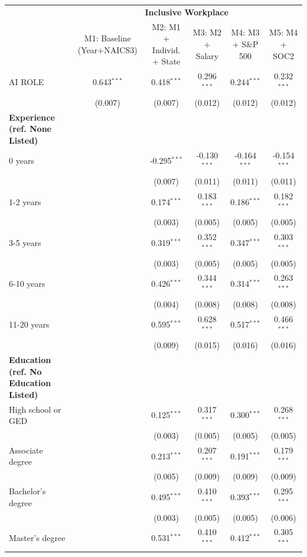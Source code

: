 \begin{table}[!htbp]
\centering
\tiny
\begin{tabular}{lccccc}
\toprule
 & \multicolumn{5}{c}{\textbf{Inclusive Workplace}} \\
 & M1: Baseline (Year+NAICS3) & M2: M1 + Individ. + State & M3: M2 + Salary & M4: M3 + S\&P 500 & M5: M4 + SOC2 \\
\midrule
AI ROLE & 0.643$^{***}$ & 0.418$^{***}$ & 0.296$^{***}$ & 0.244$^{***}$ & 0.232$^{***}$ \\
 & (0.007) & (0.007) & (0.012) & (0.012) & (0.012) \\
\midrule
\textbf{Experience (ref. None Listed)} &  &  &  &  &  \\
0 years &  & -0.295$^{***}$ & -0.130$^{***}$ & -0.164$^{***}$ & -0.154$^{***}$ \\
 &  & (0.007) & (0.011) & (0.011) & (0.011) \\
1-2 years &  & 0.174$^{***}$ & 0.183$^{***}$ & 0.186$^{***}$ & 0.182$^{***}$ \\
 &  & (0.003) & (0.005) & (0.005) & (0.005) \\
3-5 years &  & 0.319$^{***}$ & 0.352$^{***}$ & 0.347$^{***}$ & 0.303$^{***}$ \\
 &  & (0.003) & (0.005) & (0.005) & (0.005) \\
6-10 years &  & 0.426$^{***}$ & 0.344$^{***}$ & 0.314$^{***}$ & 0.263$^{***}$ \\
 &  & (0.004) & (0.008) & (0.008) & (0.008) \\
11-20 years &  & 0.595$^{***}$ & 0.628$^{***}$ & 0.517$^{***}$ & 0.466$^{***}$ \\
 &  & (0.009) & (0.015) & (0.016) & (0.016) \\
\midrule
\textbf{Education (ref. No Education Listed)} &  &  &  &  &  \\
High school or GED &  & 0.125$^{***}$ & 0.317$^{***}$ & 0.300$^{***}$ & 0.268$^{***}$ \\
 &  & (0.003) & (0.005) & (0.005) & (0.005) \\
Associate degree &  & 0.213$^{***}$ & 0.207$^{***}$ & 0.191$^{***}$ & 0.179$^{***}$ \\
 &  & (0.005) & (0.009) & (0.009) & (0.009) \\
Bachelor's degree &  & 0.495$^{***}$ & 0.410$^{***}$ & 0.393$^{***}$ & 0.295$^{***}$ \\
 &  & (0.003) & (0.005) & (0.005) & (0.006) \\
Master's degree &  & 0.531$^{***}$ & 0.410$^{***}$ & 0.412$^{***}$ & 0.305$^{***}$ \\

\end{tabular}
\end{table}
